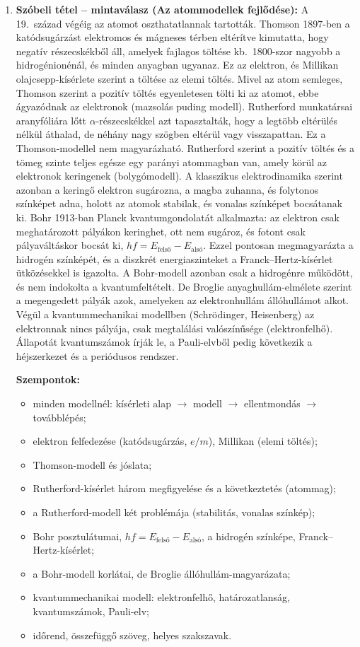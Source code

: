 \documentclass[11pt,a4paper]{article}
\begin{document}
\begin{enumerate}
\item \textbf{Szóbeli tétel -- mintaválasz (Az atommodellek fejlődése):}
  A 19.\ század végéig az atomot oszthatatlannak tartották. Thomson 1897-ben a
  katódsugárzást elektromos és mágneses térben eltérítve kimutatta, hogy negatív
  részecskékből áll, amelyek fajlagos töltése kb.\ 1800-szor nagyobb a hidrogénionénál,
  és minden anyagban ugyanaz. Ez az elektron, és Millikan olajcsepp-kísérlete szerint a
  töltése az elemi töltés. Mivel az atom semleges, Thomson szerint a pozitív töltés
  egyenletesen tölti ki az atomot, ebbe ágyazódnak az elektronok (mazsolás puding modell).
  Rutherford munkatársai aranyfóliára lőtt $\alpha$-részecskékkel azt tapasztalták, hogy a
  legtöbb eltérülés nélkül áthalad, de néhány nagy szögben eltérül vagy visszapattan. Ez
  a Thomson-modellel nem magyarázható. Rutherford szerint a pozitív töltés és a tömeg
  szinte teljes egésze egy parányi atommagban van, amely körül az elektronok keringenek
  (bolygómodell). A klasszikus elektrodinamika szerint azonban a keringő elektron
  sugározna, a magba zuhanna, és folytonos színképet adna, holott az atomok stabilak, és
  vonalas színképet bocsátanak ki. Bohr 1913-ban Planck kvantumgondolatát alkalmazta: az
  elektron csak meghatározott pályákon keringhet, ott nem sugároz, és fotont csak
  pályaváltáskor bocsát ki, $hf = E_\text{felső} - E_\text{alsó}$. Ezzel pontosan
  megmagyarázta a hidrogén színképét, és a diszkrét energiaszinteket a Franck--Hertz-kísérlet
  ütközésekkel is igazolta. A Bohr-modell azonban csak a hidrogénre működött, és nem
  indokolta a kvantumfeltételt. De Broglie anyaghullám-elmélete szerint a megengedett
  pályák azok, amelyeken az elektronhullám állóhullámot alkot. Végül a kvantummechanikai
  modellben (Schrödinger, Heisenberg) az elektronnak nincs pályája, csak megtalálási
  valószínűsége (elektronfelhő). Állapotát kvantumszámok írják le, a Pauli-elvből pedig
  következik a héjszerkezet és a periódusos rendszer.

  \medskip
  \textbf{Szempontok:}
  \begin{itemize}[nosep,leftmargin=1.5em]
    \item minden modellnél: kísérleti alap $\to$ modell $\to$ ellentmondás $\to$ továbblépés;
    \item elektron felfedezése (katódsugárzás, $e/m$), Millikan (elemi töltés);
    \item Thomson-modell és jóslata;
    \item Rutherford-kísérlet három megfigyelése és a következtetés (atommag);
    \item a Rutherford-modell két problémája (stabilitás, vonalas színkép);
    \item Bohr posztulátumai, $hf = E_\text{felső} - E_\text{alsó}$, a hidrogén színképe,
      Franck--Hertz-kísérlet;
    \item a Bohr-modell korlátai, de Broglie állóhullám-magyarázata;
    \item kvantummechanikai modell: elektronfelhő, határozatlanság, kvantumszámok,
      Pauli-elv;
    \item időrend, összefüggő szöveg, helyes szakszavak.
  \end{itemize}
\end{enumerate}
\end{document}
